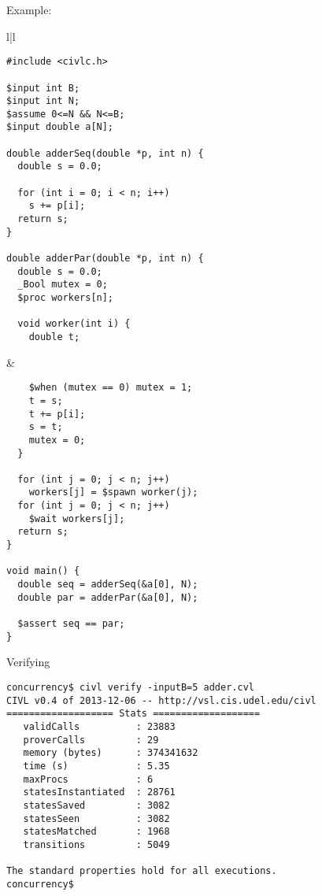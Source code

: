 \documentclass[t]{beamer}
\begin{document}
\begin{frame}[containsverbatim]{Example: }

  \begin{tabular}[t]{l|l}
    \begin{minipage}[t]{.45\textwidth}\scriptsize
\begin{verbatim}
#include <civlc.h>

$input int B;
$input int N;
$assume 0<=N && N<=B;
$input double a[N];

double adderSeq(double *p, int n) {
  double s = 0.0;
  
  for (int i = 0; i < n; i++)
    s += p[i]; 
  return s;
}

double adderPar(double *p, int n) {
  double s = 0.0;
  _Bool mutex = 0;
  $proc workers[n];

  void worker(int i) {
    double t;
\end{verbatim}
    \end{minipage}
    &
    \begin{minipage}[t]{.45\textwidth}\scriptsize
\begin{verbatim}
    $when (mutex == 0) mutex = 1;
    t = s;
    t += p[i];
    s = t;
    mutex = 0;
  }
  
  for (int j = 0; j < n; j++)
    workers[j] = $spawn worker(j);
  for (int j = 0; j < n; j++)
    $wait workers[j];
  return s;
}

void main() {
  double seq = adderSeq(&a[0], N);
  double par = adderPar(&a[0], N);

  $assert seq == par;
}
\end{verbatim}
    \end{minipage}
  \end{tabular}
\end{frame}

\begin{frame}[containsverbatim]{Verifying }

\begin{verbatim}
concurrency$ civl verify -inputB=5 adder.cvl
CIVL v0.4 of 2013-12-06 -- http://vsl.cis.udel.edu/civl
=================== Stats ===================
   validCalls          : 23883
   proverCalls         : 29
   memory (bytes)      : 374341632
   time (s)            : 5.35
   maxProcs            : 6
   statesInstantiated  : 28761
   statesSaved         : 3082
   statesSeen          : 3082
   statesMatched       : 1968
   transitions         : 5049

The standard properties hold for all executions.
concurrency$
\end{verbatim}
\end{frame}
\end{document}
